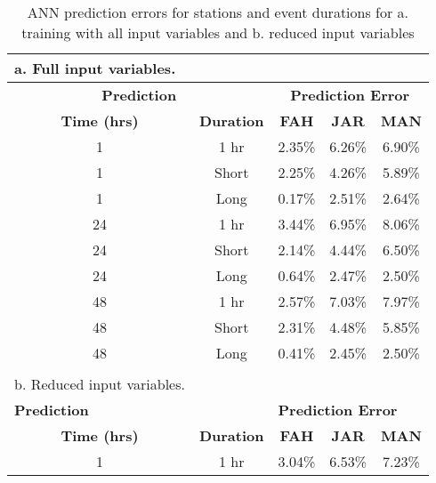 \begin{table}[H]
\centering
\caption{ANN prediction errors for stations and event durations for a. training with all input variables and b. reduced input variables}
\label{tb:ANNresults}
\begin{tabular}{ccccc}
\multicolumn{5}{l}{a. Full input variables.}\\                                                    
\hline
\multicolumn{2}{c}{\textbf{Prediction}}         & \multicolumn{3}{c}{\textbf{Prediction Error}} \\
\textbf{Time (hrs)}         & \textbf{Duration} & \textbf{FAH}  & \textbf{JAR}  & \textbf{MAN}  \\ \hline
1                           & 1 hr              & 2.35\%        & 6.26\%        & 6.90\%        \\
1                           & Short             & 2.25\%        & 4.26\%        & 5.89\%        \\
1                           & Long              & 0.17\%        & 2.51\%        & 2.64\%        \\ \hline
24                          & 1 hr              & 3.44\%        & 6.95\%        & 8.06\%        \\
24                          & Short             & 2.14\%        & 4.44\%        & 6.50\%        \\
24                          & Long              & 0.64\%        & 2.47\%        & 2.50\%        \\ \hline
48                          & 1 hr              & 2.57\%        & 7.03\%        & 7.97\%        \\
48                          & Short             & 2.31\%        & 4.48\%        & 5.85\%        \\
48                          & Long              & 0.41\%        & 2.45\%        & 2.50\%        \\ \hline
                            &                   &               &               &               \\
b. Reduced input variables. &                   &               &               &               \\
\multicolumn{2}{l}{\textbf{Prediction}}         & \multicolumn{3}{l}{\textbf{Prediction Error}} \\
\textbf{Time (hrs)}         & \textbf{Duration} & \textbf{FAH}  & \textbf{JAR}  & \textbf{MAN}  \\ \hline
1                           & 1 hr              & 3.04\%        & 6.53\%        & 7.23\%        \\

\end{tabular}
\end{table}

